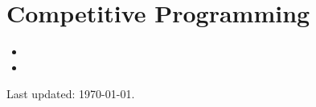 \documentclass{article}
\begin{document}
	\section{Competitive Programming}
	\begin{itemize}
		\item{}
		\item{}
	\end{itemize}
	Last updated: \today.
\end{document}

